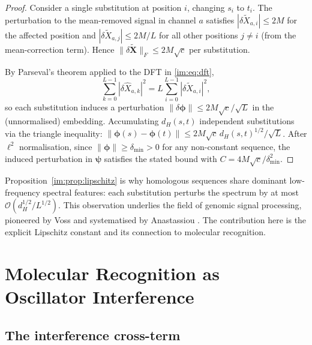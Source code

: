 \begin{proof}
Consider a single substitution at position $i$, changing $s_i$ to $t_i$.
The perturbation to the mean-removed signal in channel $a$ satisfies
$|\delta\widetilde{X}_{a,i}| \leq 2M$ for the affected position and
$|\delta\widetilde{X}_{a,j}| \leq 2M/L$ for all other positions $j \neq i$
(from the mean-correction term). Hence
$\|\delta\widetilde{\mathbf{X}}\|_F \leq 2M\sqrt{c}$ per substitution.

By Parseval's theorem applied to the DFT in \eqref{im:eq:dft},
\[
  \sum_{k=0}^{L-1}|\delta\widehat{X}_{a,k}|^2
  = L\sum_{i=0}^{L-1}|\delta\widetilde{X}_{a,i}|^2,
\]
so each substitution induces a perturbation
$\|\delta\bm{\phi}\| \leq 2M\sqrt{c}/\sqrt{L}$ in the (unnormalised)
embedding. Accumulating $d_H(s,t)$ independent substitutions via the
triangle inequality:
$\|\bm{\phi}(s) - \bm{\phi}(t)\| \leq 2M\sqrt{c}\,d_H(s,t)^{1/2}/\sqrt{L}$.
After $\ell^2$ normalisation, since $\|\bm{\phi}\| \geq \delta_{\min} > 0$
for any non-constant sequence, the induced perturbation in $\bm{\psi}$
satisfies the stated bound with $C = 4M\sqrt{c}/\delta_{\min}^2$.
\end{proof}

\begin{remark}
Proposition~\ref{im:prop:lipschitz} is why homologous sequences share dominant
low-frequency spectral features: each substitution perturbs the spectrum by at
most $\mathcal{O}(d_H^{1/2}/L^{1/2})$. This observation underlies the
field of genomic signal processing, pioneered by Voss \citep{voss1992} and
systematised by Anastassiou \citep{anastassiou2001}. The contribution here is
the explicit Lipschitz constant and its connection to molecular recognition.
\end{remark}

\section{Molecular Recognition as Oscillator Interference}
\label{im:sec:recognition}

\subsection{The interference cross-term}
\label{im:sec:cross_term}

